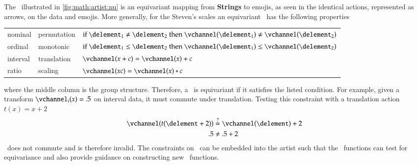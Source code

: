 \documentclass[journal]{vgtc}                %
\begin{document}
The \vchannel\ illustrated in \autoref{fig:math:artist:nu} is an equivariant mapping from \textbf{Strings} to emojis, as seen in the identical actions, represented as arrows, on the data and emojis. More generally, for the Steven's scales\cite{stevensTheoryScalesMeasurement1946} an equivariant \vchannel\ has the following properties
\begin{table}[H]
  \begin{tabulary}{\columnwidth}{llL}
      nominal & permutation &  $\text{if } \delement_1 \neq \delement_2 \text{ then } \vchannel (\delement_1) \neq\vchannel(\delement_2)$\\
      ordinal &  monotonic & $\text{if } \delement_1 \leq \delement_2 \text{ then } \vchannel (\delement_1) \leq \vchannel(\delement_2)$\\
      interval &  translation &  $\vchannel (x + c) = \vchannel(x) + c$ \\
      ratio &  scaling &  $\vchannel(xc) = \vchannel(x)*c $\\
  \end{tabulary}
\end{table}
\noindent where the middle column is the group structure. Therefore, a \vchannel\ is equivariant if it satisfies the listed condition. For example, given a transform $\vchannel_{i}(x) = .5$ on interval data, it must commute under translation. Testing this constraint with a translation action $t(x) = x+2$
\begin{align*}
  \vchannel(t(\delement + 2)) & \overset{?}{=} \vchannel(\delement) + 2\\
  .5 &\neq .5 + 2
\end{align*}
\vchannel\ does not commute and is therefore invalid. The constraints on \vchannel\ can be embedded into the artist such that the \vchannel\ functions can test for equivariance and also provide guidance on constructing new \vchannel\ functions. 
\end{document}
